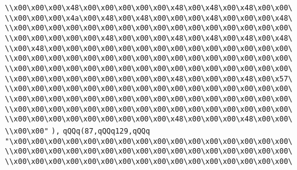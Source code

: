 \verb|\\x00\x00\x00\x48\x00\x00\x00\x00\x00\x48\x00\x48\x00\x48\x00\x00\|\newline
\verb|\\x00\x00\x00\x4a\x00\x48\x00\x48\x00\x00\x00\x48\x00\x00\x00\x48\|\newline
\verb|\\x00\x00\x00\x00\x00\x00\x00\x00\x00\x00\x00\x00\x00\x00\x00\x00\|\newline
\verb|\\x00\x00\x00\x00\x00\x48\x00\x00\x00\x48\x00\x48\x00\x48\x00\x48\|\newline
\verb|\\x00\x48\x00\x00\x00\x00\x00\x00\x00\x00\x00\x00\x00\x00\x00\x00\|\newline
\verb|\\x00\x00\x00\x00\x00\x00\x00\x00\x00\x00\x00\x00\x00\x00\x00\x00\|\newline
\verb|\\x00\x00\x00\x00\x00\x00\x00\x00\x00\x00\x00\x00\x00\x00\x00\x00\|\newline
\verb|\\x00\x00\x00\x00\x00\x00\x00\x00\x00\x48\x00\x00\x00\x48\x00\x57\|\newline
\verb|\\x00\x00\x00\x00\x00\x00\x00\x00\x00\x00\x00\x00\x00\x00\x00\x00\|\newline
\verb|\\x00\x00\x00\x00\x00\x00\x00\x00\x00\x00\x00\x00\x00\x00\x00\x00\|\newline
\verb|\\x00\x00\x00\x00\x00\x00\x00\x00\x00\x00\x00\x00\x00\x00\x00\x00\|\newline
\verb|\\x00\x00\x00\x00\x00\x00\x00\x00\x00\x48\x00\x00\x00\x48\x00\x00\|\newline
\verb|\\x00\x00"|\newline
\verb|),|\newline
\verb|qQQq(87,qQQq129,qQQq|\newline
\verb|"\x00\x00\x00\x00\x00\x00\x00\x00\x00\x00\x00\x00\x00\x00\x00\x00\|\newline
\verb|\\x00\x00\x00\x00\x00\x00\x00\x00\x00\x00\x00\x00\x00\x00\x00\x00\|\newline
\verb|\\x00\x00\x00\x00\x00\x00\x00\x00\x00\x00\x00\x00\x00\x00\x00\x00\|\newline
